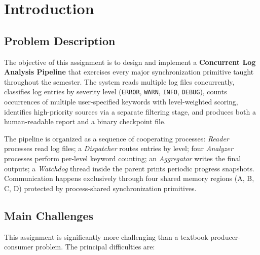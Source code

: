 \documentclass[11pt,a4paper]{article}
\newcommand{\code}[1]{\texttt{\small #1}}
\begin{document}
\section{Introduction}

\subsection{Problem Description}

The objective of this assignment is to design and implement a
\textbf{Concurrent Log Analysis Pipeline} that exercises every major
synchronization primitive taught throughout the semester. The system reads
multiple log files concurrently, classifies log entries by severity level
(\code{ERROR}, \code{WARN}, \code{INFO}, \code{DEBUG}), counts occurrences of
multiple user-specified keywords with level-weighted scoring, identifies
high-priority sources via a separate filtering stage, and produces both a
human-readable report and a binary checkpoint file.

The pipeline is organized as a sequence of cooperating processes:
\textit{Reader} processes read log files; a \textit{Dispatcher} routes
entries by level; four \textit{Analyzer} processes perform per-level
keyword counting; an \textit{Aggregator} writes the final outputs; a
\textit{Watchdog} thread inside the parent prints periodic progress
snapshots. Communication happens exclusively through four shared memory
regions (A, B, C, D) protected by process-shared synchronization primitives.

\subsection{Main Challenges}

This assignment is significantly more challenging than a textbook
producer-consumer problem. The principal difficulties are:
\end{document}
